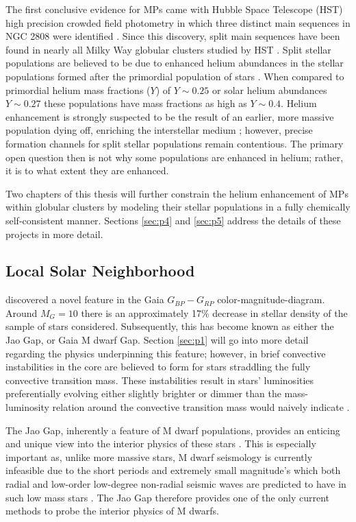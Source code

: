 The first conclusive evidence for MPs came with Hubble Space Telescope (HST)
high precision crowded field photometry in which three distinct main sequences
in NGC 2808 were identified \citep{Piotto2007}. Since this discovery, split
main sequences have been found in nearly all Milky Way globular clusters
studied by HST \citep{anderson2009,milone2011}. Split stellar populations are
believed to be due to enhanced helium abundances in the stellar populations
formed after the primordial population of stars \citep{d2005,Piotto2007}. When
compared to primordial helium mass fractions ($Y$) of $Y\sim 0.25$
\citep{collaboration2016planck} or solar helium abundances $Y\sim0.27$
\citep{vinyoles2017new} these populations have mass fractions as high as $Y\sim
0.4$. Helium enhancement is strongly suspected to be the result of an earlier,
more massive population dying off, enriching the interstellar medium
\citep{Gratton2001, Gratton2004, Gratton2012}; however, precise formation channels
for split stellar populations remain contentious. The primary open question then
is not why some populations are enhanced in helium; rather, it is to what
extent they are enhanced. 

Two chapters of this thesis will further constrain the helium enhancement of
MPs within globular clusters by modeling their stellar populations in a fully
chemically self-consistent manner. Sections \ref{sec:p4} and
\ref{sec:p5} address the details of these projects in more detail.

\subsection{Local Solar Neighborhood}
\citet{Jao2018} discovered a novel feature in the Gaia $G_{BP}-G_{RP}$
color-magnitude-diagram. Around $M_{G}=10$ there is an approximately 17\%
decrease in stellar density of the sample of stars \citeauthor{Jao2018}
considered. Subsequently, this has become known as either the Jao Gap, or Gaia
M dwarf Gap. Section \ref{sec:p1} will go into more detail regarding the
physics underpinning this feature; however, in brief convective instabilities in
the core are believed to form for stars straddling the fully convective
transition mass. These instabilities result in stars' luminosities
preferentially evolving either slightly brighter or dimmer than the
mass-luminosity relation around the convective transition mass would naively
indicate \citep{Jao2020}.

The Jao Gap, inherently a feature of M dwarf populations, provides an enticing
and unique view into the interior physics of these stars \citep{Feiden2021}.
This is especially important as, unlike more massive stars, M dwarf seismology
is currently infeasible due to the short periods and extremely small
magnitude's which both radial and low-order low-degree non-radial seismic waves
are predicted to have in such low mass stars \citep{Rodriguez-Lopez2019}. The
Jao Gap therefore provides one of the only current methods to probe the
interior physics of M dwarfs.

